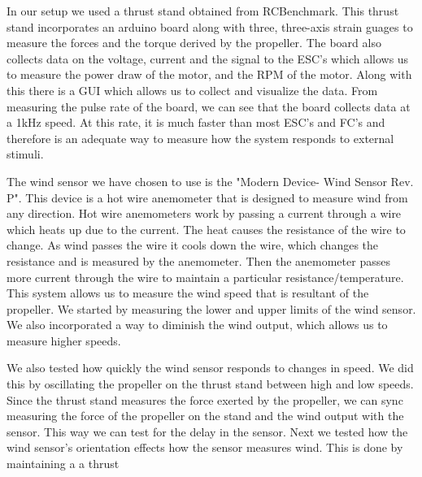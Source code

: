 \documentclass[twocolumn]{article}
\begin{document}
In our setup we used a thrust stand obtained from RCBenchmark. This thrust stand incorporates an arduino board along with three, three-axis strain guages to measure the forces and the torque derived by the propeller. The board also collects data on the voltage, current and the signal to the ESC's which allows us to measure the power draw of the motor, and the RPM of the motor. Along with this there is a GUI which allows us to collect and visualize the data. From measuring the pulse rate of the board, we can see that the board collects data at a 1kHz speed. At this rate, it is much faster than most ESC's and FC's and therefore is an adequate way to measure how the system responds to external stimuli. 

The wind sensor we have chosen to use is the "Modern Device- Wind Sensor Rev. P". This device is a hot wire anemometer that is designed to measure wind from any direction. Hot wire anemometers work by passing a current through a wire which heats up due to the current. The heat causes the resistance of the wire to change. As wind passes the wire it cools down the wire, which changes the resistance and is measured by the anemometer. Then the anemometer passes more current through the wire to maintain a particular resistance/temperature. This system allows us to measure the wind speed that is resultant of the propeller. We started by measuring the lower and upper limits of the wind sensor. We also incorporated a way to diminish the wind output, which allows us to measure higher speeds.


We also tested how quickly the wind sensor responds to changes in speed. We did this by oscillating the propeller on the thrust stand between high and low speeds. Since the thrust stand measures the force exerted by the propeller, we can sync measuring the force of the propeller on the stand and the wind output with the sensor. This way we can test for the delay in the sensor.
Next we tested how the wind sensor's orientation effects how the sensor measures wind. This is done by maintaining a a thrust
\end{document}
